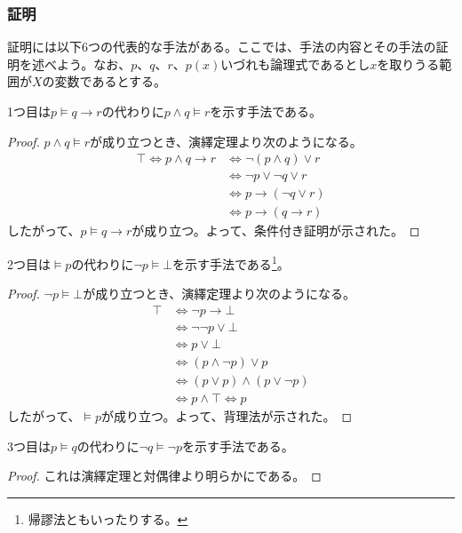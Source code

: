 \documentclass[a4paper]{jsarticle}
\begin{document}
\subsubsection{証明}%
証明には以下6つの代表的な手法がある。ここでは、手法の内容とその手法の証明を述べよう。なお、$p$、$q$、$r$、$p(x)$いづれも論理式であるとし$x$を取りうる範囲が$X$の変数であるとする。
\begin{thm}[条件付き証明]
\label{1.1.1.10}
1つ目は$p \vDash q \rightarrow r$の代わりに$p \land q \vDash r$を示す手法である。
\end{thm}
\begin{proof}
$p \land q \vDash r$が成り立つとき、演繹定理より次のようになる。
\begin{align*}
\top \Leftrightarrow p \land q \rightarrow r &\Leftrightarrow \neg(p \land q) \vee r \\ 
&\Leftrightarrow \neg p \vee \neg q \vee r \\
&\Leftrightarrow p \rightarrow (\neg q \vee r) \\ 
&\Leftrightarrow p \rightarrow (q \rightarrow r)
\end{align*}
したがって、$p \vDash q \rightarrow r$が成り立つ。よって、条件付き証明が示された。
\end{proof}
\begin{thm}[背理法]
\label{1.1.1.11}
2つ目は$\vDash p$の代わりに$\neg p \vDash \bot$を示す手法である\footnote{帰謬法ともいったりする。}。
\end{thm}
\begin{proof}
$\neg p \vDash \bot$が成り立つとき、演繹定理より次のようになる。
\begin{align*}
\top &\Leftrightarrow \neg p \rightarrow \bot \\ 
&\Leftrightarrow \neg\neg p \vee \bot \\ 
&\Leftrightarrow p \vee \bot \\
&\Leftrightarrow (p \land \neg p) \vee p \\
&\Leftrightarrow (p \vee p) \land (p \vee \neg p) \\
&\Leftrightarrow p \land \top \Leftrightarrow p
\end{align*}
したがって、$\vDash p$が成り立つ。よって、背理法が示された。
\end{proof}
\begin{thm}[対偶法]
\label{1.1.1.12}
3つ目は$p \vDash q$の代わりに$\neg q \vDash \neg p$を示す手法である。
\end{thm}
\begin{proof}
これは演繹定理と対偶律より明らかにである。
\end{proof}
\end{document}
